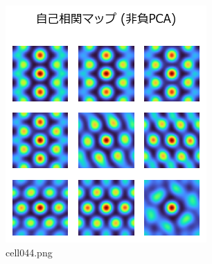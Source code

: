 \begin{figure}[ht]
	\centering
	\includegraphics[scale=0.8, max width=\linewidth]{./fig/local-learning-rule/pca-hebbian-learning/cell044.png}
	\caption{cell044.png}
	\label{cell044.png}
\end{figure}